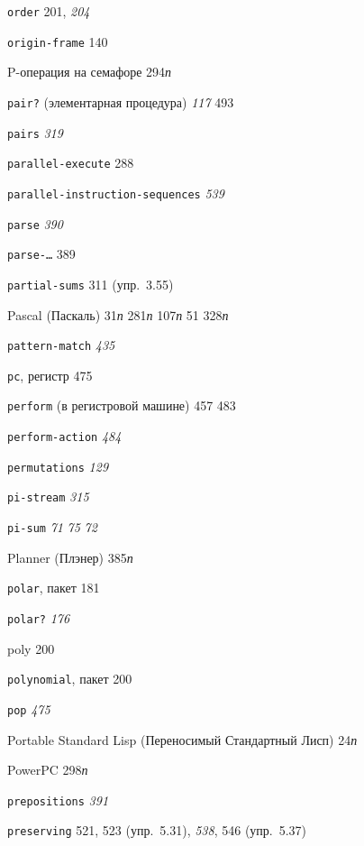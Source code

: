 \begin{theindex}
\item {\texttt{order}} 201, {\it 204}
\item {\texttt{origin-frame}} 140
\bigskip
\item {P-операция на семафоре} 294{\it п}
\item {\texttt{pair?} (элементарная процедура)} {\it 117}
   493
\item {\texttt{pairs}} {\it 319}
\item {\texttt{parallel-execute}} 288
\item {\texttt{parallel-instruction-sequences}} {\it 539}
\item {\texttt{parse}} {\it 390}
\item {\texttt{parse-\ldots}} 389
\item {\texttt{partial-sums}} 311 (упр.~3.55)
\item {Pascal (Паскаль)} 31{\it п}
   281{\it п}
   107{\it п}
   51
   328{\it п}
\item {\texttt{pattern-match}} {\it 435}
\item {\texttt{pc}, регистр} 475
\item {\texttt{perform} (в регистровой машине)} 457
   483
\item {\texttt{perform-action}} {\it 484}
\item {\texttt{permutations}} {\it 129}
\item {\texttt{pi-stream}} {\it 315}
\item {\texttt{pi-sum}} {\it 71}
   {\it 75}
   {\it 72}
\item {Planner (Плэнер)} 385{\it п}
\item {\texttt{polar}, пакет} 181
\item {\texttt{polar?}} {\it 176}
\item {poly} 200
\item {\texttt{polynomial}, пакет} 200
\item {\texttt{pop}} {\it 475}
\item {Portable Standard Lisp (Переносимый Стандартный Лисп)} 24{\it п}
\item {PowerPC} 298{\it п}
\item {\texttt{prepositions}} {\it 391}
\item {\texttt{preserving}} 521, 523 (упр.~5.31), {\it 538}, 546 (упр.~5.37)

\end{theindex}
